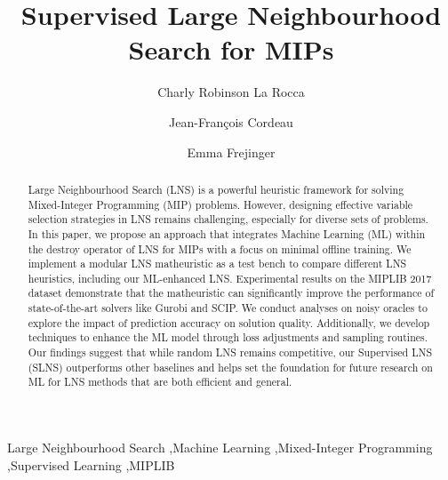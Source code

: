 \documentclass[3p, authoryear, times]{elsarticle}
\begin{document}
\begin{frontmatter}

\title{Supervised Large Neighbourhood Search for MIPs}

 
            \author[1]{Charly Robinson La Rocca}

            \author[2]{Jean-François Cordeau}

            \author[1]{Emma Frejinger}




        

\begin{abstract}
    Large Neighbourhood Search (LNS) is a powerful heuristic framework for solving Mixed-Integer Programming (MIP) problems. However, designing effective variable selection strategies in LNS remains challenging, especially for diverse sets of problems. In this paper, we propose an approach that integrates Machine Learning (ML) within the destroy operator of LNS for MIPs with a focus on minimal offline training. We implement a modular LNS matheuristic as a test bench to compare different LNS heuristics, including our ML-enhanced LNS.  Experimental results on the MIPLIB 2017 dataset demonstrate that the matheuristic can significantly improve the performance of state-of-the-art solvers like Gurobi and SCIP. We conduct analyses on noisy oracles to explore the impact of prediction accuracy on solution quality.  Additionally, we develop techniques to enhance the ML model through loss adjustments and sampling routines. Our findings suggest that while random LNS remains competitive, our Supervised LNS (SLNS) outperforms other baselines and helps set the foundation for future research on ML for LNS methods that are both efficient and general. 
\end{abstract}
    
\begin{keyword}
    Large Neighbourhood Search \sep Machine Learning \sep Mixed-Integer Programming \sep  Supervised Learning \sep MIPLIB 
\end{keyword}



\end{frontmatter}
\end{document}

